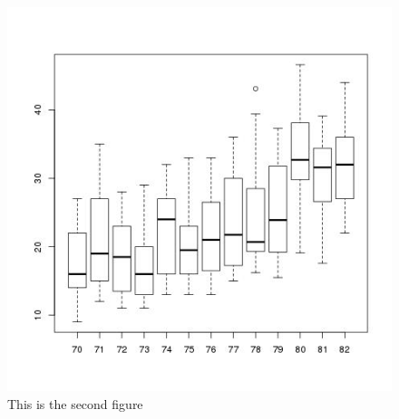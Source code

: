 \documentclass[letter,10pt]{article}
\begin{document}
\begin{minipage}{\linewidth}
\begin{minipage}{0.45\linewidth}
\begin{figure}[H]
              \includegraphics[width=\linewidth]{bp_mpg_year.jpg}
              \caption{This is the second figure}
          \end{figure}
      \end{minipage}
  \end{minipage}
  
\end{document}
